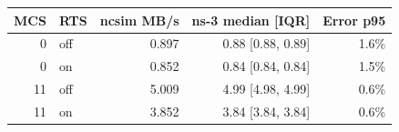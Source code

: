 \begin{tabular}{rlrrr}
\toprule
MCS & RTS & ncsim MB/s & ns-3 median [IQR] & Error p95 \\
\midrule
0 & off & 0.897 & 0.88 [0.88, 0.89] & 1.6\% \\
0 & on & 0.852 & 0.84 [0.84, 0.84] & 1.5\% \\
11 & off & 5.009 & 4.99 [4.98, 4.99] & 0.6\% \\
11 & on & 3.852 & 3.84 [3.84, 3.84] & 0.6\% \\
\bottomrule
\end{tabular}
